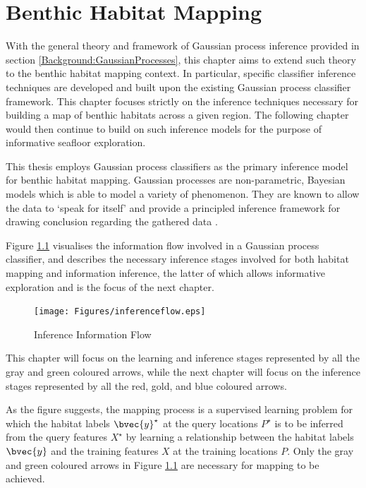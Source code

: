 \chapter{Benthic Habitat Mapping}
\label{BenthicHabitatMapping}
	
	 With the general theory and framework of Gaussian process inference provided in section \ref{Background:GaussianProcesses}, this chapter aims to extend such theory to the benthic habitat mapping context. In particular, specific classifier inference techniques are developed and built upon the existing Gaussian process classifier framework. This chapter focuses strictly on the inference techniques necessary for building a map of benthic habitats across a given region. The following chapter would then continue to build on such inference models for the purpose of informative seafloor exploration. 
	
	This thesis employs Gaussian process classifiers as the primary inference model for benthic habitat mapping. Gaussian processes are non-parametric, Bayesian models which is able to model a variety of phenomenon. They are known to allow the data to `speak for itself' and provide a principled inference framework for drawing conclusion regarding the gathered data \citep{GaussianProcessForMachineLearning}. 
	
	Figure \ref{Figure:InferenceFlow} visualises the information flow involved in a Gaussian process classifier, and describes the necessary inference stages involved for both habitat mapping and information inference, the latter of which allows informative exploration and is the focus of the next chapter.

	\begin{figure}[!htbp]
	\centering
		\texttt{[image: Figures/inferenceflow.eps]}
	\caption{Inference Information Flow}
	\label{Figure:InferenceFlow}
	\end{figure}	
			
	This chapter will focus on the learning and inference stages represented by all the {\color{Gray} gray} and {\color{ForestGreen} green} coloured arrows, while the next chapter will focus on the inference stages represented by all the {\color{OrangeRed} red}, {\color{YellowOrange} gold}, and {\color{Cerulean} blue} coloured arrows.
	
	As the figure suggests, the mapping process is a supervised learning problem for which the habitat labels $\bvec{y}^{\star}$ at the query locations $P^{\star}$ is to be inferred from the query features $X^{\star}$ by learning a relationship between the habitat labels $\bvec{y}$ and the training features $X$ at the training locations $P$. Only the {\color{Gray} gray} and {\color{ForestGreen} green} coloured arrows in Figure \ref{Figure:InferenceFlow} are necessary for mapping to be achieved.
	
